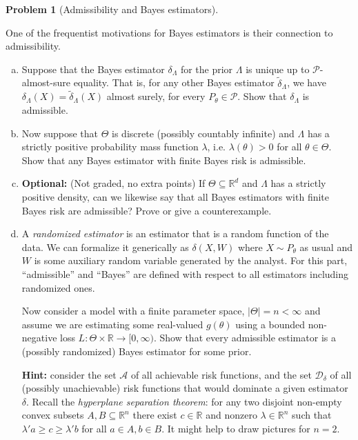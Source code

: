 \documentclass{article}
\newcommand{\cP}{\mathcal{P}}
\newcommand{\RR}{\mathbb{R}}
\newcommand{\optional}{{\bf Optional:} (Not graded, no extra points) }
\theoremstyle{definition}
\newtheorem{problem}{Problem}
\begin{document}
\begin{problem}[Admissibility and Bayes estimators]
\label{prob:admissibility-bayes}

One of the frequentist motivations for Bayes estimators is their connection to admissibility.

\begin{enumerate}[(a)]
\item Suppose that the Bayes estimator $\delta_{\Lambda}$ for the prior $\Lambda$ is unique up to $\cP$-almost-sure equality. That is, for any other Bayes estimator $\tilde\delta_{\Lambda}$, we have $\delta_\Lambda(X) = \tilde\delta_\Lambda(X)$ almost surely, for every $P_\theta\in\cP$. Show that $\delta_\Lambda$ is admissible.



\item Now suppose that $\Theta$ is discrete (possibly countably infinite) and $\Lambda$ has a strictly positive probability mass function $\lambda$, i.e. $\lambda(\theta) > 0$ for all $\theta\in \Theta$. Show that any Bayes estimator with finite Bayes risk is admissible.



\item \optional If $\Theta \subseteq \RR^d$ and $\Lambda$ has a strictly positive density, can we likewise say that all Bayes estimators with finite Bayes risk are admissible? Prove or give a counterexample.



\item A {\em randomized estimator} is an estimator that is a random function of the data. We can formalize it generically as $\delta(X,W)$ where $X\sim P_\theta$ as usual and $W$ is some auxiliary random variable generated by the analyst. For this part, ``admissible'' and ``Bayes'' are defined with respect to all estimators including randomized ones.

Now consider a model with a finite parameter space, $|\Theta|=n<\infty$ and assume we are estimating some real-valued $g(\theta)$ using a bounded non-negative loss $L:\Theta \times \RR \to [0,\infty)$. Show that every admissible estimator is a (possibly randomized) Bayes estimator for some prior.

{\bf Hint:} consider the set $\mathcal{A}$ of all achievable risk functions, and the set $\mathcal{D}_\delta$ of all (possibly unachievable) risk functions that would dominate a given estimator $\delta$. Recall the {\em hyperplane separation theorem}: for any two disjoint non-empty convex subsets $A,B\subseteq\RR^n$ there exist $c\in\RR$ and nonzero $\lambda\in\RR^n$ such that $\lambda'a \geq c \geq \lambda'b$ for all $a\in A, b\in B$. It might help to draw pictures for $n=2$.




\end{enumerate}
\end{problem}
\end{document}

